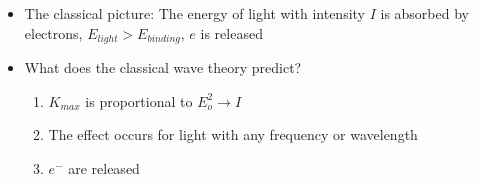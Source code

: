 \begin{itemize}
    \begin{itemize}

      \item The classical picture: The energy of light with intensity $I$ is absorbed by electrons, $E_{light} > E_{binding}$, $e$ is released


      \item What does the classical wave theory predict?

        \begin{enumerate}

          \item $K_{max}$ is proportional to $E_o^2\rightarrow\boxed{I}$

          \item The effect occurs for light with any frequency or wavelength

          \item $e^-$ are released

        \end{enumerate}

    \end{itemize}

\end{itemize}



